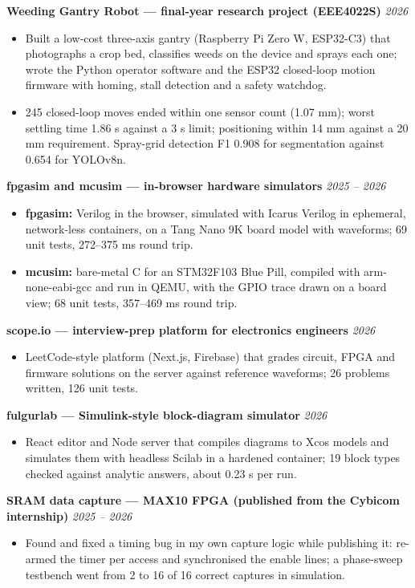 \documentclass[10pt,a4paper]{article}
\newcommand{\workentry}[2]{%
  \noindent\textbf{\small #1} \hfill
  \textit{\small #2}\par
  \vspace{2pt}
}
\begin{document}
\workentry{Weeding Gantry Robot --- final-year research project (EEE4022S)}{2026}
\begin{itemize}
  \item Built a low-cost three-axis gantry (Raspberry Pi Zero W, ESP32-C3) that photographs a crop bed, classifies weeds on the device and sprays each one; wrote the Python operator software and the ESP32 closed-loop motion firmware with homing, stall detection and a safety watchdog.
  \item 245 closed-loop moves ended within one sensor count (1.07 mm); worst settling time 1.86 s against a 3 s limit; positioning within 14 mm against a 20 mm requirement. Spray-grid detection F1 0.908 for segmentation against 0.654 for YOLOv8n.
\end{itemize}
\vspace{2pt}
\workentry{fpgasim and mcusim --- in-browser hardware simulators}{2025 -- 2026}
\begin{itemize}
  \item \textbf{fpgasim:} Verilog in the browser, simulated with Icarus Verilog in ephemeral, network-less containers, on a Tang Nano 9K board model with waveforms; 69 unit tests, 272--375 ms round trip.
  \item \textbf{mcusim:} bare-metal C for an STM32F103 Blue Pill, compiled with arm-none-eabi-gcc and run in QEMU, with the GPIO trace drawn on a board view; 68 unit tests, 357--469 ms round trip.
\end{itemize}
\vspace{2pt}
\workentry{scope.io --- interview-prep platform for electronics engineers}{2026}
\begin{itemize}
  \item LeetCode-style platform (Next.js, Firebase) that grades circuit, FPGA and firmware solutions on the server against reference waveforms; 26 problems written, 126 unit tests.
\end{itemize}
\vspace{2pt}
\workentry{fulgurlab --- Simulink-style block-diagram simulator}{2026}
\begin{itemize}
  \item React editor and Node server that compiles diagrams to Xcos models and simulates them with headless Scilab in a hardened container; 19 block types checked against analytic answers, about 0.23 s per run.
\end{itemize}
\vspace{2pt}
\workentry{SRAM data capture --- MAX10 FPGA (published from the Cybicom internship)}{2025 -- 2026}
\begin{itemize}
  \item Found and fixed a timing bug in my own capture logic while publishing it: re-armed the timer per access and synchronised the enable lines; a phase-sweep testbench went from 2 to 16 of 16 correct captures in simulation.
\end{itemize}
\end{document}
